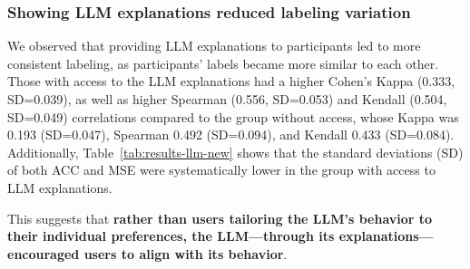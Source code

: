 



\subsubsection{Showing LLM explanations reduced labeling variation}
We observed that providing LLM explanations to participants led to more consistent labeling, as participants' labels became more similar to each other. 
Those with access to the LLM explanations had a higher Cohen's Kappa (0.333, SD=0.039), as well as higher Spearman (0.556, SD=0.053) and Kendall (0.504, SD=0.049) correlations compared to the group without access, whose Kappa was 0.193 (SD=0.047), Spearman 0.492 (SD=0.094), and Kendall 0.433 (SD=0.084).
Additionally, Table~\ref{tab:results-llm-new} shows that the standard deviations (SD) of both ACC and MSE were systematically lower in the group with access to LLM explanations.

This suggests that \textbf{rather than users tailoring the LLM's behavior to their individual preferences, the LLM---through its explanations---encouraged users to align with its behavior}.







